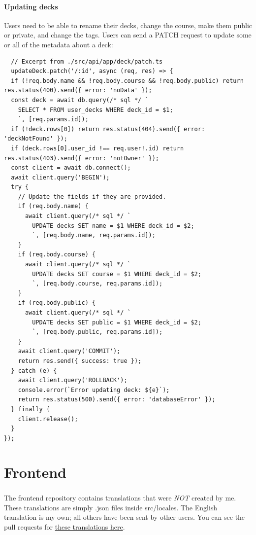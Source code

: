 \documentclass{report}
\begin{document}
\subsubsection{Updating decks}
Users need to be able to rename their decks, change the course, make them public or private, and change the tags. Users can send a PATCH request to update some or all of the metadata about a deck:

  \begin{verbatim}
  // Excerpt from ./src/api/app/deck/patch.ts
  updateDeck.patch('/:id', async (req, res) => {
  if (!req.body.name && !req.body.course && !req.body.public) return res.status(400).send({ error: 'noData' });
  const deck = await db.query(/* sql */ `
    SELECT * FROM user_decks WHERE deck_id = $1;
    `, [req.params.id]);
  if (!deck.rows[0]) return res.status(404).send({ error: 'deckNotFound' });
  if (deck.rows[0].user_id !== req.user!.id) return res.status(403).send({ error: 'notOwner' });
  const client = await db.connect();
  await client.query('BEGIN');
  try {
    // Update the fields if they are provided.
    if (req.body.name) {
      await client.query(/* sql */ `
        UPDATE decks SET name = $1 WHERE deck_id = $2;
        `, [req.body.name, req.params.id]);
    }
    if (req.body.course) {
      await client.query(/* sql */ `
        UPDATE decks SET course = $1 WHERE deck_id = $2;
        `, [req.body.course, req.params.id]);
    }
    if (req.body.public) {
      await client.query(/* sql */ `
        UPDATE decks SET public = $1 WHERE deck_id = $2;
        `, [req.body.public, req.params.id]);
    }
    await client.query('COMMIT');
    return res.send({ success: true });
  } catch (e) {
    await client.query('ROLLBACK');
    console.error(`Error updating deck: ${e}`);
    return res.status(500).send({ error: 'databaseError' });
  } finally {
    client.release();
  }
});
  \end{verbatim}

\chapter{Frontend}

\paragraph{}
The frontend repository contains translations that were \emph{NOT} created by me. These translations are simply .json files inside src/locales. The English translation is my own; all others have been sent by other users. You can see the pull requests for
\href{https://github.com/iroase-app/frontend/pulls?q=is%3Apr+label%3Alocalization+}{these translations here}.
\end{document}
